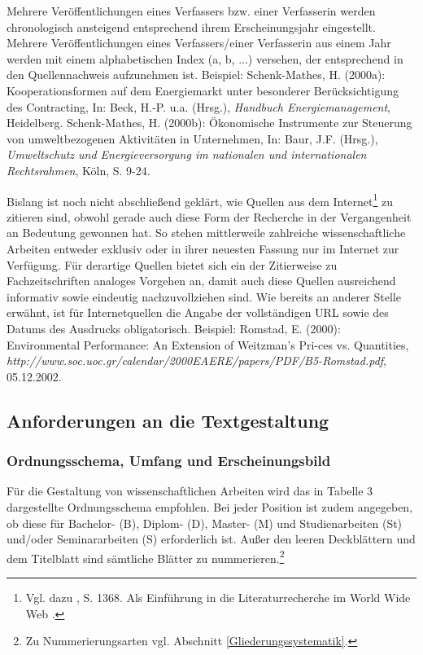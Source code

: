 \documentclass[a4paper, 12pt]{article}
\begin{document}
Mehrere Ver\"{o}ffentlichungen eines Verfassers bzw. einer Verfasserin werden
chronologisch ansteigend entsprechend ihrem Erscheinungsjahr eingestellt. Mehrere
Ver\"{o}ffentlichungen eines Verfassers/einer Verfasserin aus einem Jahr werden mit
einem alphabetischen Index (a, b, ...) versehen, der entsprechend in den
Quellennachweis aufzunehmen ist. Beispiel: Schenk-Mathes, H. (2000a):
Kooperationsformen auf dem Energiemarkt unter besonderer Ber\"{u}cksichtigung des
Contracting, In: Beck, H.-P. u.a. (Hrsg.), \emph{Handbuch Energiemanagement},
Heidelberg. Schenk-Mathes, H. (2000b): \"{O}konomische Instrumente zur Steuerung von
umweltbezogenen Aktivit\"{a}ten in Unternehmen, In: Baur, J.F. (Hrsg.),
\emph{Umweltschutz und Energieversorgung im nationalen und internationalen
Rechtsrahmen}, K\"{o}ln, S. 9-24.

Bislang ist noch nicht abschlie\ss end gekl\"{a}rt, wie Quellen aus dem
Internet\footnote{Vgl. dazu \cite{alb1998}, S. 1368. Als Einf\"{u}hrung in die
Literaturrecherche im World Wide Web \cite{jss1996}.} zu zitieren sind, obwohl
gerade auch diese Form der Recherche in der Vergangenheit an Bedeutung gewonnen hat.
So stehen mittlerweile zahlreiche wissenschaftliche Arbeiten entweder exklusiv oder
in ihrer neuesten Fassung nur im Internet zur Verf\"{u}gung. F\"{u}r derartige Quellen
bietet sich ein der Zitierweise zu Fachzeitschriften analoges Vorgehen an, damit
auch diese Quellen ausreichend informativ sowie eindeutig nachzuvollziehen sind. Wie
bereits an anderer Stelle erw\"{a}hnt, ist f\"{u}r Internetquellen die Angabe der
vollst\"{a}ndigen URL sowie des Datums des Ausdrucks obligatorisch. Beispiel: Romstad,
E. (2000): Environmental Performance: An Extension of Weitzman's Pri-ces vs.
Quantities,
\emph{http://www.soc.uoc.gr/calendar/2000EAERE/papers/PDF/B5-Romstad.pdf},
05.12.2002.

\subsection{Anforderungen an die Textgestaltung} \label{Textgestaltung}

\subsubsection{Ordnungsschema, Umfang und Erscheinungsbild}

F\"{u}r die Gestaltung von wissenschaftlichen Arbeiten wird das in Tabelle 3
dargestellte Ordnungsschema empfohlen. Bei jeder Position ist zudem angegeben, ob
diese f\"{u}r Bachelor- (B), Diplom- (D), Master- (M) und Studienarbeiten (St) und/oder
Seminararbeiten (S) erforderlich ist. Au\ss er den leeren Deckbl\"{a}ttern und dem
Titelblatt sind s\"{a}mtliche Bl\"{a}tter zu nummerieren.\footnote{Zu Nummerierungsarten
vgl. Abschnitt \ref{Gliederungssystematik}.}
\end{document}
